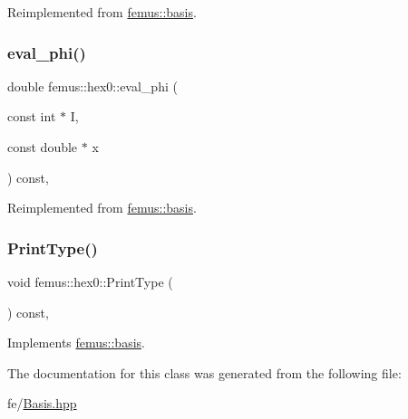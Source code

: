 Reimplemented from \mbox{\hyperlink{classfemus_1_1basis_affd9927f6e25e264108219d862b8cb3d}{femus\+::basis}}.

\mbox{\label{classfemus_1_1hex0_ad2737dbc2c4036ac4920582adde2de2c}} 
\subsubsection{\texorpdfstring{eval\+\_\+phi()}{eval\_phi()}}
{\footnotesize\ttfamily double femus\+::hex0\+::eval\+\_\+phi (\begin{DoxyParamCaption}\item[{const int $\ast$}]{I,  }\item[{const double $\ast$}]{x }\end{DoxyParamCaption}) const\hspace{0.3cm}{\ttfamily [inline]}, {\ttfamily [virtual]}}



Reimplemented from \mbox{\hyperlink{classfemus_1_1basis_a89b0797cdccffae5ff6d059b32016ae5}{femus\+::basis}}.

\mbox{\label{classfemus_1_1hex0_acd0623cd092781f05f3604e102fabe63}} 
\subsubsection{\texorpdfstring{Print\+Type()}{PrintType()}}
{\footnotesize\ttfamily void femus\+::hex0\+::\+Print\+Type (\begin{DoxyParamCaption}{ }\end{DoxyParamCaption}) const\hspace{0.3cm}{\ttfamily [inline]}, {\ttfamily [virtual]}}



Implements \mbox{\hyperlink{classfemus_1_1basis_abbae7bf8f31ec5793c911bc6d4ea0572}{femus\+::basis}}.



The documentation for this class was generated from the following file\+:\begin{DoxyCompactItemize}
\item 
fe/\mbox{\hyperlink{_basis_8hpp}{Basis.\+hpp}}\end{DoxyCompactItemize}
